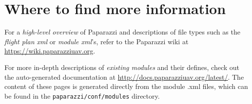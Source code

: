 \documentclass{article}
\begin{document}
%
%
%
%
%
%
%
%
%
%
%




\section{Where to find more information}
For a \emph{high-level overview} of Paparazzi and descriptions of file types such as the \emph{flight plan xml} or \emph{module xml}'s, refer to the Paparazzi wiki at \url{https://wiki.paparazziuav.org}.

For more in-depth descriptions of \emph{existing modules} and their defines, check out the auto-generated documentation at \url{http://docs.paparazziuav.org/latest/}. The content of these pages is generated directly from the module .xml files, which can be found in the \texttt{paparazzi/conf/modules} directory.
\end{document}
